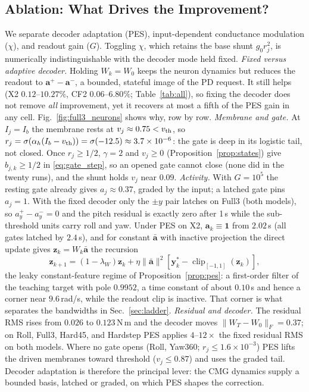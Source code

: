 \documentclass[letterpaper, 10 pt, conference]{ieeeconf}
\newcommand{\clip}{\operatorname{clip}}
\begin{document}
\subsection{Ablation: What Drives the Improvement?}\label{sec:ablation}

We separate decoder adaptation (PES), input-dependent conductance
modulation ($\chi$), and readout gain ($G$). Toggling $\chi$, which
retains the base shunt $g_0r_j^2$, is numerically indistinguishable with
the decoder mode held fixed. \emph{Fixed versus adaptive decoder.} Holding $W_k=W_0$ keeps the neuron
dynamics but reduces the readout to $\bm a^+-\bm a^-$, a bounded, stateful
image of the PD request. It still helps (X2 $0.12$--$10.27\%$, CF2
$0.06$--$6.80\%$; Table~\ref{tab:all}), so fixing the decoder does not
remove \emph{all} improvement, yet it recovers at most a fifth of the PES
gain in any cell. Fig.~\ref{fig:full3_neurons} shows why, row by row.
\emph{Membrane and gate.} At $I_j=I_b$ the membrane rests at
$v_j\approx0.75<v_{\rm th}$, so
$r_j=\sigma(\alpha_h(I_b-v_{\rm th}))=\sigma(-12.5)\approx3.7\times10^{-6}$:
the gate is deep in its logistic tail, not closed. Once $r_j\ge1/2$,
$\gamma=2$ and $v_j\ge0$ (Proposition~\ref{prop:states}) give
$b_{j,k}\ge1/2$ in \eqref{eq:gate_step}, so an opened gate cannot close
(none did in the twenty runs), and the shunt holds $v_j$ near $0.09$.
\emph{Activity.} With $G=10^5$ the resting gate already gives
$a_j\approx0.37$, graded by the input; a latched gate pins $a_j=1$. With
the fixed decoder only the $\pm y$ pair latches on Full3 (both models), so
$a^+_y-a^-_y=0$ and the pitch residual is exactly zero after 1\,s while
the sub-threshold units carry roll and yaw. Under PES on X2,
$\bm a_k\equiv\bm1$ from $2.02$\,s (all gates latched by $2.4$\,s), and
for constant $\bar{\bm a}$ with inactive projection the direct update
gives $\bm z_k=W_k\bar{\bm a}$ the recursion
\begin{equation}
 \bm z_{k+1}=(1-\lambda_W)\bm z_k
 +\eta\|\bar{\bm a}\|^2[\bm y_k^*-\clip_{[-1,1]}(\bm z_k)],
 \label{eq:constantbasis}
\end{equation}
the leaky constant-feature regime of Proposition~\ref{prop:pes}: a
first-order filter of the teaching target with pole $0.9952$, a time constant
of about $0.10$\,s and hence a corner near $9.6$\,rad/s, while the readout clip
is inactive. That corner is what separates the bandwidths in
Sec.~\ref{sec:ladder}.
\emph{Residual and decoder.} The residual RMS rises from $0.026$ to
$0.123$\,N\,m and the decoder moves $\|W_T-W_0\|_F=0.37$; on Roll, Full3,
Hard45, and Hardstep PES applies $4$--$12\times$ the fixed residual RMS on
both models. Where no gate opens (Roll, Yaw360; $r_j\le1.6\times10^{-3}$)
PES lifts the driven membranes toward threshold ($v_j\le0.87$) and uses
the graded tail. Decoder adaptation is therefore the principal lever: the
CMG dynamics supply a bounded basis, latched or graded, on which PES
shapes the correction.
\end{document}
